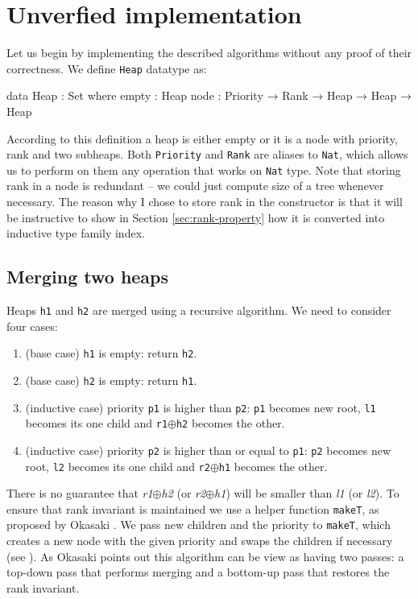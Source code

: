 \section[Unverfied implementation]{Unverfied implementation} \label{sec:no-proofs}
Let us begin by implementing the described algorithms without any proof of their correctness. We define \texttt{Heap} datatype as:

\begin{code}
data Heap : Set where
  empty : Heap
  node  : Priority → Rank → Heap → Heap → Heap
\end{code}
\noindent
According to this definition a heap is either empty or it is a node with priority, rank and two subheaps. Both \texttt{Priority} and \texttt{Rank} are aliases to \texttt{Nat}, which allows us to perform on them any operation that works on \texttt{Nat} type. Note that storing rank in a node is redundant -- we could just compute size of a tree whenever necessary. The reason why I chose to store rank in the constructor is that it will be instructive to show in Section \ref{sec:rank-property} how it is converted into inductive type family index.

\subsection{Merging two heaps}\label{sec:twopass-merge}

Heaps \texttt{h1} and \texttt{h2} are merged using a recursive algorithm. We need to consider four cases:

\begin{enumerate}
 \item (base case) \texttt{h1} is empty: return \texttt{h2}.
 \item (base case) \texttt{h2} is empty: return \texttt{h1}.
 \item (inductive case) priority \texttt{p1} is higher than \texttt{p2}: \texttt{p1} becomes new root, \texttt{l1} becomes its one child and \texttt{r1}$\oplus$\texttt{h2} becomes the other.
 \item (inductive case) priority \texttt{p2} is higher than or equal to \texttt{p1}: \texttt{p2} becomes new root, \texttt{l2} becomes its one child and \texttt{r2}$\oplus$\texttt{h1} becomes the other.
\end{enumerate}
\noindent
There is no guarantee that \textit{r1}$\oplus$\textit{h2} (or \textit{r2}$\oplus$\textit{h1}) will be smaller than \textit{l1} (or \textit{l2}). To ensure that rank invariant is maintained we use a helper function \texttt{makeT}, as proposed by Okasaki \cite{Oka99}. We pass new children and the priority to \texttt{makeT}, which creates a new node with the given priority and swaps the children if necessary (see ). As Okasaki points out this algorithm can be view as having two passes: a top-down pass that performs merging and a bottom-up pass that restores the rank invariant.


